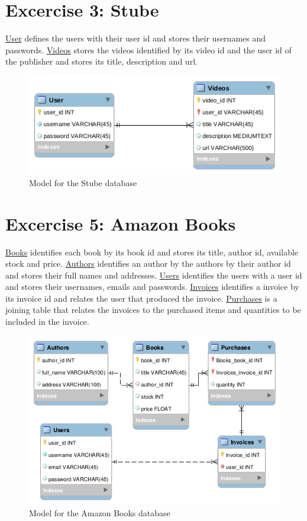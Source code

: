 \documentclass{article}
\begin{document}
\section{Excercise 3: Stube}
\underline{User} defines the users with their user id and stores their usernames and passwords. \underline{Videos} stores the videos identified by its video id and the user id of the publisher and stores its title, description and url. 
\begin{figure}[h!]
 \centering
  \includegraphics[width=0.8\linewidth]{stube.png}
  \caption{Model for the Stube database}
  \label{fig:Stube DB}
\end{figure}

\section{Excercise 5: Amazon Books}
\underline{Books} identifies each book by its book id and stores its title, author id, available stock and price. \underline{Authors} identifies an author by the authors by their author id and stores their full names and addresses. \underline{Users} identifies the users with a user id and stores their usernames, emails and passwords. \underline{Invoices} identifies a invoice by its invoice id and relates the user that produced the invoice.  \underline{Purchases} is a joining table that relates the invoices to the purchased items and quantities to be included in the invoice.
\begin{figure}[h!]
 \centering
  \includegraphics[width=0.8\linewidth]{amazon.png}
  \caption{Model for the Amazon Books database}
  \label{fig:Amazon Books DB}
\end{figure}
\end{document}
